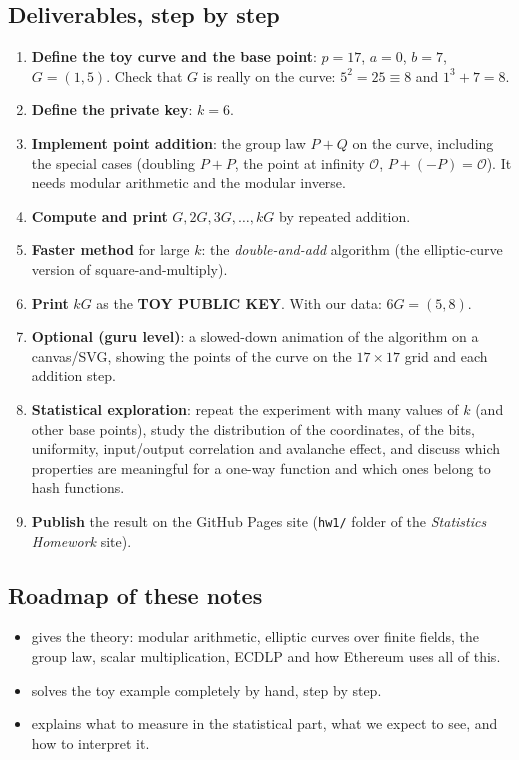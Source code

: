 \subsection{Deliverables, step by step}

\begin{enumerate}
  \item \textbf{Define the toy curve and the base point}: $p = 17$, $a = 0$, $b = 7$, $G = (1,5)$. Check that $G$ is really on the curve: $5^2 = 25 \equiv 8$ and $1^3 + 7 = 8$. \checkmark
  \item \textbf{Define the private key}: $k = 6$.
  \item \textbf{Implement point addition}: the group law $P + Q$ on the curve, including the special cases (doubling $P + P$, the point at infinity $\mathcal{O}$, $P + (-P) = \mathcal{O}$). It needs modular arithmetic and the modular inverse.
  \item \textbf{Compute and print} $G, 2G, 3G, \ldots, kG$ by repeated addition.
  \item \textbf{Faster method} for large $k$: the \textit{double-and-add} algorithm (the elliptic-curve version of square-and-multiply).
  \item \textbf{Print} $kG$ as the \textbf{TOY PUBLIC KEY}. With our data: $6G = (5,8)$.
  \item \textbf{Optional (guru level)}: a slowed-down animation of the algorithm on a canvas/SVG, showing the points of the curve on the $17 \times 17$ grid and each addition step.
  \item \textbf{Statistical exploration}: repeat the experiment with many values of $k$ (and other base points), study the distribution of the coordinates, of the bits, uniformity, input/output correlation and avalanche effect, and discuss which properties are meaningful for a one-way function and which ones belong to hash functions.
  \item \textbf{Publish} the result on the GitHub Pages site (\texttt{hw1/} folder of the \textit{Statistics Homework} site).
\end{enumerate}

\subsection{Roadmap of these notes}

\begin{itemize}
  \item {} gives the theory: modular arithmetic, elliptic curves over finite fields, the group law, scalar multiplication, ECDLP and how Ethereum uses all of this.
  \item {} solves the toy example completely by hand, step by step.
  \item {} explains what to measure in the statistical part, what we expect to see, and how to interpret it.
\end{itemize}
